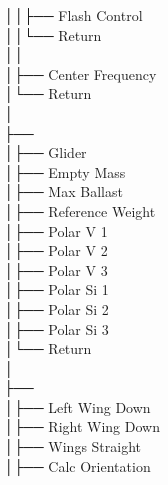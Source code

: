 │\hspace{2em}│\hspace{2em}├── Flash Control \\
│\hspace{2em}│\hspace{2em}└── Return \\
│\hspace{2em}│\hspace{2em} \\
│\hspace{2em}├── Center Frequency \\
│\hspace{2em}└── Return \\
│\hspace{2em} \\
├──  \\
│\hspace{2em}├── Glider \\
│\hspace{2em}├── Empty Mass \\
│\hspace{2em}├── Max Ballast \\
│\hspace{2em}├── Reference Weight \\
│\hspace{2em}├── Polar V 1 \\
│\hspace{2em}├── Polar V 2 \\
│\hspace{2em}├── Polar V 3 \\
│\hspace{2em}├── Polar Si 1 \\
│\hspace{2em}├── Polar Si 2 \\
│\hspace{2em}├── Polar Si 3 \\
│\hspace{2em}└── Return \\
│\hspace{2em} \\
├──  \\
│\hspace{2em}├── Left Wing Down \\
│\hspace{2em}├── Right Wing Down \\
│\hspace{2em}├── Wings Straight \\
│\hspace{2em}├── Calc Orientation \\
